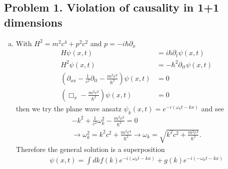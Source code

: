 \documentclass[10pt,a4paper]{book}
\theoremstyle{definition}
\begin{document}
\subsection{Problem 1. Violation of causality in 1+1 dimensions}
\begin{enumerate}[(a)]
\item With $H^2=m^2c^4+p^2c^2$ and $p=-i\hbar\partial_x$
\begin{align}
H\psi(x,t)&=i\hbar\partial_t\psi(x,t)\\
H^2\psi(x,t)&=-\hbar^2\partial_{tt}\psi(x,t)\\
\left(\partial_{xx}-\frac{1}{c^2}\partial_{tt}-\frac{m^2c^2}{\hbar^2}\right)\psi(x,t)&=0\\
\left(\Box_{x}-\frac{m^2c^2}{\hbar^2}\right)\psi(x,t)&=0
\end{align}
then we try the plane wave ansatz $\psi_k(x,t)=e^{-i(\omega_k t-kx)}$ and see
\begin{align}
-k^2+\frac{1}{c^2}\omega_k^2-\frac{m^2c^2}{\hbar^2}=0\\
\rightarrow\omega_k^2=k^2c^2+\frac{m^2c^4}{\hbar^2}
\rightarrow\omega_k=\sqrt{k^2c^2+\frac{m^2c^4}{\hbar^2}}.
\end{align}
Therefore the general solution is a superposition
\begin{align}
\psi(x,t)=\int dk f(k)e^{-i(\omega_k t-kx)} + g(k) e^{-i(-\omega_k t-kx)}
\end{align}



\end{enumerate}
\end{document}
